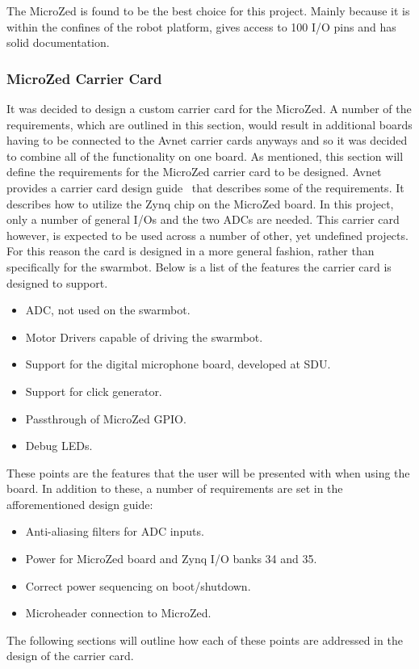 The MicroZed is found to be the best choice for this project.
Mainly because it is within the confines of the robot platform, gives access to 100 I/O pins and has solid documentation.

\subsubsection*{MicroZed Carrier Card}
It was decided to design a custom carrier card for the MicroZed.
A number of the requirements, which are outlined in this section, would result in additional boards having to be connected to the Avnet carrier cards anyways and so it was decided to combine all of the functionality on one board.
As mentioned, this section will define the requirements for the MicroZed carrier card to be designed.
Avnet provides a carrier card design guide~\cite{design_carrier} that describes some of the requirements.
It describes how to utilize the Zynq chip on the MicroZed board.
In this project, only a number of general I/Os and the two ADCs are needed.
This carrier card however, is expected to be used across a number of other, yet undefined projects.
For this reason the card is designed in a more general fashion, rather than specifically for the swarmbot.
Below is a list of the features the carrier card is designed to support.
\begin{itemize}
	\item ADC, not used on the swarmbot.
	\item Motor Drivers capable of driving the swarmbot.
	\item Support for the digital microphone board, developed at SDU.
	\item Support for click generator.
	\item Passthrough of MicroZed GPIO.
	\item Debug LEDs.
\end{itemize}

These points are the features that the user will be presented with when using the board.
In addition to these, a number of requirements are set in the afforementioned design guide:

\begin{itemize}
	\item Anti-aliasing filters for ADC inputs.
	\item Power for MicroZed board and Zynq I/O banks 34 and 35.
	\item Correct power sequencing on boot/shutdown.
	\item Microheader connection to MicroZed.
\end{itemize}

The following sections will outline how each of these points are addressed in the design of the carrier card.
